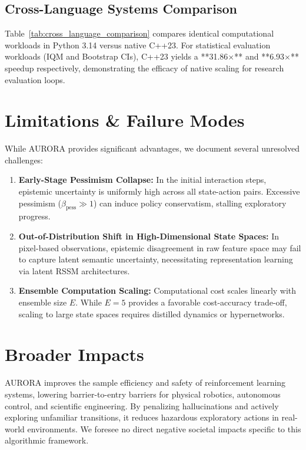\documentclass[11pt,a4paper]{article}
\theoremstyle{definition}
\theoremstyle{remark}
\begin{document}
\subsection{Cross-Language Systems Comparison}



Table~\ref{tab:cross_language_comparison} compares identical computational workloads in Python 3.14 versus native C++23. For statistical evaluation workloads (IQM and Bootstrap CIs), C++23 yields a **31.86$\times$** and **6.93$\times$** speedup respectively, demonstrating the efficacy of native scaling for research evaluation loops.

\section{Limitations \& Failure Modes}
\label{sec:limitations}

While AURORA provides significant advantages, we document several unresolved challenges:
\begin{enumerate}
    \item \textbf{Early-Stage Pessimism Collapse:} In the initial interaction steps, epistemic uncertainty is uniformly high across all state-action pairs. Excessive pessimism ($\beta_{\text{pess}} \gg 1$) can induce policy conservatism, stalling exploratory progress.
    \item \textbf{Out-of-Distribution Shift in High-Dimensional State Spaces:} In pixel-based observations, epistemic disagreement in raw feature space may fail to capture latent semantic uncertainty, necessitating representation learning via latent RSSM architectures.
    \item \textbf{Ensemble Computation Scaling:} Computational cost scales linearly with ensemble size $E$. While $E=5$ provides a favorable cost-accuracy trade-off, scaling to large state spaces requires distilled dynamics or hypernetworks.
\end{enumerate}

\section{Broader Impacts}
\label{sec:impact}

AURORA improves the sample efficiency and safety of reinforcement learning systems, lowering barrier-to-entry barriers for physical robotics, autonomous control, and scientific engineering. By penalizing hallucinations and actively exploring unfamiliar transitions, it reduces hazardous exploratory actions in real-world environments. We foresee no direct negative societal impacts specific to this algorithmic framework.
\end{document}
